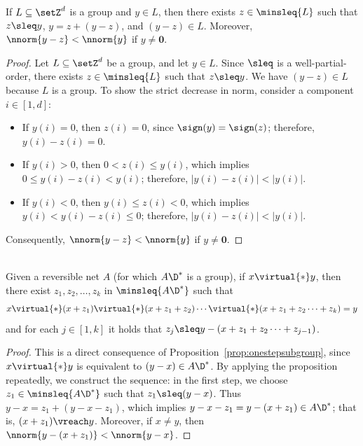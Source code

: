 \begin{prop}\label{prop:onestepsubgroup}
	If $L\subseteq \setZ^d$ is a group and
	$y\in L$, then there exists $z\in\minsleq{L}$ such that
	$z\sleq y$, $y=z+(y-z)$,   
	and $(y-z)\in L$. Moreover, $\nnorm{y-z}<\nnorm{y}$
 if $y\neq\mathbf{0}$.
\end{prop}	
\begin{proof}
Let $L\subseteq \setZ^d$ be a group, and
let $y\in L$.
	Since $\sleq$ is a well-partial-order, there exists $z\in\minsleq{L}$ such that $z\sleq
	y$. We have $(y-z)\in L$ because $L$ is a group.
To show the strict decrease in norm, consider a component $i\in[1,d]$:
	\begin{itemize}
		\item
			If $y(i)=0$, then $z(i)=0$, since
			$\sign(y)=\sign(z)$; therefore, $y(i)-z(i)=0$.
\item
If $y(i)>0$, then $0<z(i)\leq y(i)$, 
which implies $0\leq y(i)-z(i)<y(i)$; therefore,
$|y(i)-z(i)|<|y(i)|$.
\item
If $y(i)<0$, then $y(i)\leq z(i)<0$, 
			which implies $y(i)<y(i)-z(i)\leq 0$;
			therefore, 
$|y(i)-z(i)|<|y(i)|$.
\end{itemize}
Consequently, $\nnorm{y-z}<\nnorm{y}$ if
	$y\neq\mathbf{0}$.
\end{proof}

\begin{cor}\label{cor:subgroup}
\hfill\\
	Given a reversible net $A$ (for which $A\D^*$ is a group), if
	$x\virtual{*}y$, then 
	there exist $z_1,z_2,\dots,z_k$ in $\minsleq{A\D^*}$
such that
\begin{equation}\label{eq:decompseq}
x\virtual{*}(x+z_1)\virtual{*}(x+z_1+z_2)\cdots\virtual{*}(x+z_1+z_2\cdots
	+z_k)=y
\end{equation}	
and for each $j\in[1,k]$ it holds that
 $z_j\sleq y-(x+z_1+z_2\cdots +z_{j-1})$.
\end{cor}
\begin{proof}
This is a direct consequence of Proposition~\ref{prop:onestepsubgroup},
since $x\virtual{*}y$ is equivalent to $(y-x)\in A\D^*$. 
By applying the proposition repeatedly, we construct the sequence:
in the first step, we choose
$z_1\in\minsleq{A\D^*}$ such that 
$z_1\sleq (y-x)$. Thus $y-x=z_1+(y-x-z_1)$, which implies
$y-x-z_1=y-(x+z_1)\in A\D^*$; that is,
$(x+z_1)\vreach y$. Moreover, if  $x\neq y$, then
$\nnorm{y-(x+z_1)}<\nnorm{y-x}$.
\end{proof}

